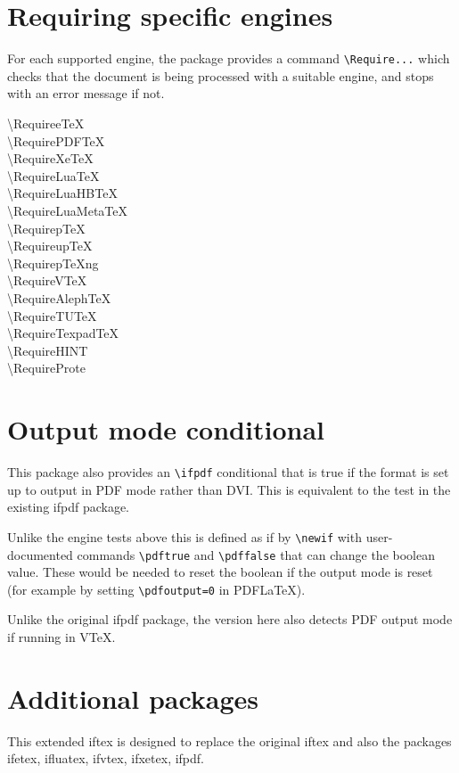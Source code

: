 \documentclass{article}
\newcommand\cs[1]{{\ttfamily\textbackslash #1}}
\begin{document}
\section{Requiring specific engines}
For each supported engine, the package provides a command
\verb|\Require...| which checks that the document is being processed
with a suitable engine, and stops with an error message if not.

\begin{description}
\item[\cs{RequireeTeX}]
\item[\cs{RequirePDFTeX}]
\item[\cs{RequireXeTeX}]
\item[\cs{RequireLuaTeX}]
\item[\cs{RequireLuaHBTeX}]
\item[\cs{RequireLuaMetaTeX}]
\item[\cs{RequirepTeX}]
\item[\cs{RequireupTeX}]
\item[\cs{RequirepTeXng}]
\item[\cs{RequireVTeX}]
\item[\cs{RequireAlephTeX}]
\item[\cs{RequireTUTeX}]
\item[\cs{RequireTexpadTeX}]
\item[\cs{RequireHINT}]
\item[\cs{RequireProte}]
\end{description}


\section{Output mode conditional}
This package also provides an \verb|\ifpdf| conditional that is true
if the format is set up to output in PDF mode rather than DVI. This is
equivalent to the test in the existing \textsf{ifpdf} package.

Unlike the engine tests above this is defined as if by \verb|\newif|
with user-documented commands \verb|\pdftrue| and \verb|\pdffalse| that can
change the boolean value. These would be needed to reset the boolean
if the output mode is reset (for example by setting
\verb|\pdfoutput=0| in PDF\LaTeX).

Unlike the original \textsf{ifpdf} package, the version here also
detects PDF output mode if running in V\TeX.

\section{Additional packages}
This extended \textsf{iftex} is designed to replace the original
\textsf{iftex} and also the packages
\textsf{ifetex},
\textsf{ifluatex},
\textsf{ifvtex},
\textsf{ifxetex},
\textsf{ifpdf}.
\end{document}
